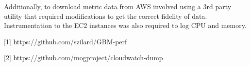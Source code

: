 \documentclass[11pt]{article}
\begin{document}
Additionally, to download metric data from AWS involved using a 3rd party utility that required modifications to get the correct fidelity of data. Instrumentation to the EC2 instances was also required to log CPU and memory.

\hspace{16pt}

[1] https://github.com/szilard/GBM-perf

[2] https://github.com/mogproject/cloudwatch-dump
\end{document}
